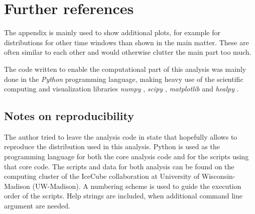 \chapter{Further references}
The appendix is mainly used to show additional plots, for example for distributions for other time windows than shown in the main matter.
These are often similar to each other and would otherwise clutter the main part too much.

The code written to enable the computational part of this analysis was mainly done in the \emph{Python} programming language, making heavy use of the scientific computing and visualization libraries \emph{numpy} \cite{numpy}, \emph{scipy} \cite{scipy}, \emph{matplotlib} \cite{matplotlib} and \emph{healpy} \cite{Gorski:2004by}.

\section{Notes on reproducibility}
The author tried to leave the analysis code in state that hopefully allows to reproduce the distribution used in this analysis.
Python is used as the programming language for both the core analysis code and for the scripts using that core code.
The scripts and data for both analysis can be found on the computing cluster of the IceCube collaboration at University of Wisconsin-Madison (UW-Madison).
A numbering scheme is used to guide the execution order of the scripts.
Help strings are included, when additional command line argument are needed.

